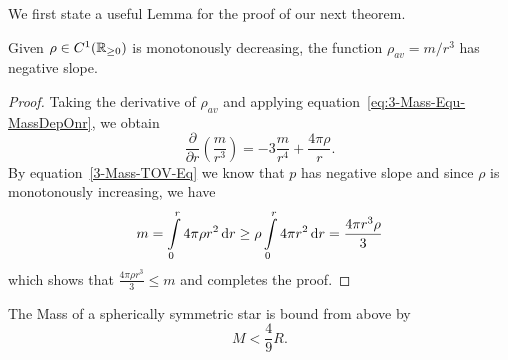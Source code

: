 We first state a useful Lemma for the proof of our next theorem.
\begin{lemma}
	Given $\rho\in C^1(\mathbb{R}_{\geq0})$ is monotonously decreasing, the function $\rho_{av}=m/r^3$ has negative slope.
\end{lemma}
\begin{proof}
	Taking the derivative of $\rho_{av}$ and applying equation~\eqref{eq:3-Mass-Equ-MassDepOnr}, we obtain
	\begin{equation}
		\frac{\partial}{\partial r}\left(\frac{m}{r^3}\right) = -3\frac{m}{r^4} + \frac{4\pi\rho}{r}.
	\end{equation}
	By equation~\eqref{3-Mass-TOV-Eq} we know that $p$ has negative slope and since $\rho$ is monotonously increasing, we have
	\begin{equation}
		m = \int\limits_0^r 4\pi\rho r^2 \mathop{}\!\mathrm{d} r \geq \rho\int\limits_0^r4\pi r^2 \mathop{}\!\mathrm{d} r= \frac{4\pi r^3\rho}{3}
	\end{equation}
	which shows that $\frac{4\pi\rho r^3}{3}\leq m$ and completes the proof.
\end{proof}\noindent
\begin{theorem}
	The Mass of a spherically symmetric star is bound from above by
	\begin{equation}
		M < \frac{4}{9}R.
	\end{equation}
\end{theorem}
